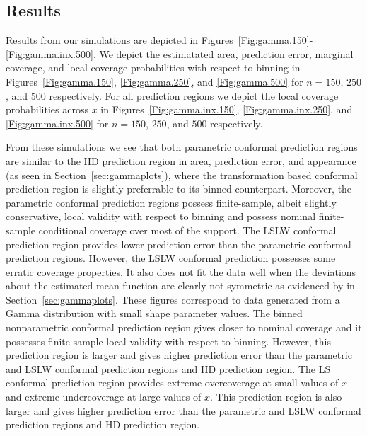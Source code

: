 \documentclass[11pt]{article}\usepackage[]{graphicx}\usepackage[]{color}
\begin{document}
\newpage
\subsection{Results}
\label{sec:Gamma-Results}

Results from our simulations are depicted in 
Figures~\ref{Fig:gamma.150}-\ref{Fig:gamma.inx.500}.  
We depict the estimatated area, prediction error, marginal coverage, and 
local coverage probabilities with respect to binning in 
Figures~\ref{Fig:gamma.150}, \ref{Fig:gamma.250}, and \ref{Fig:gamma.500} 
for $n = 150$, $250$, and $500$ respectively.  For all prediction 
regions we depict the local coverage probabilities across $x$ in
Figures~\ref{Fig:gamma.inx.150}, \ref{Fig:gamma.inx.250}, and 
\ref{Fig:gamma.inx.500} for $n = 150$, $250$, and $500$ respectively.

From these simulations we see that both parametric conformal prediction 
regions are similar to the HD prediction region in area, prediction error, and 
appearance (as seen in Section~\ref{sec:gammaplots}), where the transformation 
based conformal prediction region is slightly preferrable to its binned counterpart.  
Moreover, the parametric conformal prediction regions possess finite-sample, 
albeit slightly conservative, local validity with respect to binning and 
possess nominal finite-sample conditional coverage over most of the support. 
The LSLW conformal prediction region provides lower prediction error than the 
parametric conformal prediction regions.  However, the LSLW conformal 
prediction possesses some erratic coverage properties.  
It also does not fit the data well when the deviations about the 
estimated mean function are clearly not symmetric as evidenced by 
in Section~\ref{sec:gammaplots}.  These figures correspond to data generated 
from a Gamma distribution with small shape parameter values.  
The binned nonparametric conformal prediction region gives closer to nominal 
coverage and it possesses finite-sample local validity with respect to 
binning.  However, this prediction region is larger and gives higher 
prediction error than the parametric and LSLW conformal prediction 
regions and HD prediction region.  The LS conformal prediction region 
provides extreme overcoverage at small values of $x$ and extreme 
undercoverage at large values of $x$.  This prediction region is also larger 
and gives higher prediction error than the parametric and LSLW conformal 
prediction regions and HD prediction region.
\end{document}
